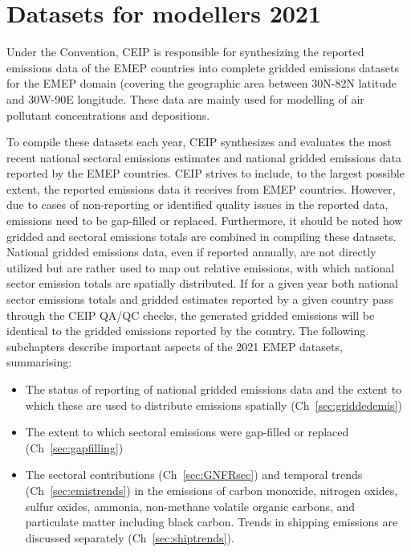 \section{Datasets for modellers 2021}
\label{sec:modeldata}

Under the Convention, CEIP is responsible for synthesizing the reported emissions data of the EMEP countries into complete gridded emissions datasets for the EMEP domain (covering the geographic area between 30\degrees N-82\degrees N latitude and 30\degrees W-90\degrees E longitude. These data are mainly used for modelling of air pollutant concentrations and depositions.

To compile these datasets each year, CEIP synthesizes and evaluates the most recent national sectoral emissions estimates and national gridded emissions data reported by the EMEP countries. CEIP strives to include, to the largest possible extent, the reported emissions data it receives from EMEP countries. However, due to cases of non-reporting or identified quality issues in the reported data, emissions need to be gap-filled or replaced. Furthermore, it should be noted how gridded and sectoral emissions totals are combined in compiling these datasets. National gridded emissions data, even if reported annually, are not directly utilized but are rather used to map out relative emissions, with which national sector emission totals are spatially distributed. If for a given year both national sector emissions totals and gridded estimates reported by a given country pass through the CEIP QA/QC checks, the generated gridded emissions will be identical to the gridded emissions reported by the country.
The following subchapters describe important aspects of the 2021 EMEP datasets, summarising:

\begin{itemize}
    \item The status of reporting of national gridded emissions data and the extent to which these are used to distribute emissions spatially (Ch~\ref{sec:griddedemis})
    \item The extent to which sectoral emissions were gap-filled or replaced (Ch~\ref{sec:gapfilling})
    \item  The sectoral contributions (Ch~\ref{sec:GNFRsec}) and temporal trends (Ch~\ref{sec:emistrends}) in the emissions of carbon monoxide, nitrogen oxides, sulfur oxides, ammonia, non-methane volatile organic carbons, and particulate matter including black carbon. Trends in shipping emissions are discussed separately (Ch~\ref{sec:shiptrends}).     
\end{itemize}


